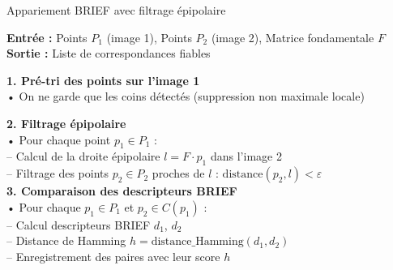 \begin{frame}{Appariement BRIEF avec filtrage épipolaire}
\scriptsize

\textbf{Entrée :} Points $P_1$ (image 1), Points $P_2$ (image 2), Matrice fondamentale $F$ \\
\textbf{Sortie :} Liste de correspondances fiables

\vspace{0.3em}
\textbf{1. Pré-tri des points sur l'image 1} \\
\hspace{1em}• On ne garde que les coins détectés (suppression non maximale locale)

\vspace{0.3em}
\textbf{2. Filtrage épipolaire} \\
\hspace{1em}• Pour chaque point $p_1 \in P_1$ : \\
\hspace{2em}– Calcul de la droite épipolaire $l = F \cdot p_1$ dans l'image 2 \\
\hspace{2em}– Filtrage des points $p_2 \in P_2$ proches de $l$ : $\text{distance}(p_2, l) < \varepsilon$
\pause
\vspace{0.3em}\\
\textbf{3. Comparaison des descripteurs BRIEF} \\
\hspace{1em}• Pour chaque $p_1 \in P_1$ et $p_2 \in C(p_1)$ : \\
\hspace{2em}– Calcul descripteurs BRIEF $d_1$, $d_2$ \\
\hspace{2em}– Distance de Hamming $h = \text{distance\_Hamming}(d_1, d_2)$ \\
\hspace{2em}– Enregistrement des paires avec leur score $h$

\end{frame}


